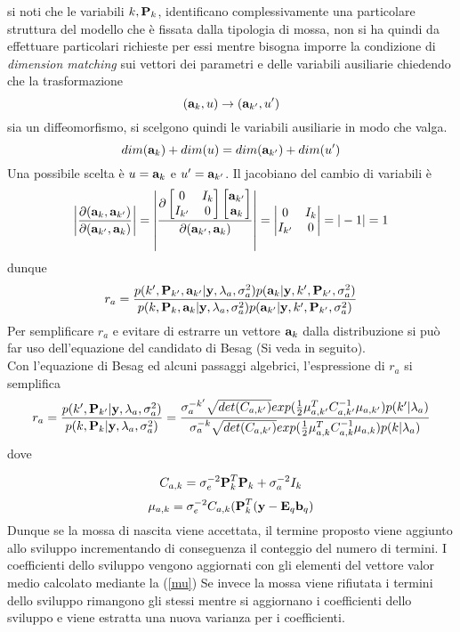 si noti che le variabili $k,\textbf{P}_k$, identificano complessivamente una particolare struttura
del modello che è fissata dalla tipologia di mossa, non si ha quindi da effettuare particolari richieste per essi mentre bisogna imporre la condizione di \textit{ dimension matching}
sui vettori dei parametri e delle variabili ausiliarie chiedendo che la trasformazione\\
\begin{equation}
(\textbf{a}_k,u)\rightarrow(\textbf{a}_{k'},u')
\end{equation}
sia un diffeomorfismo, si scelgono quindi le variabili ausiliarie in modo che valga.
\begin{equation}
dim(\textbf{a}_k)+dim(u)=dim(\textbf{a}_{k'})+dim(u')
\end{equation}
Una possibile scelta è $u = \textbf{a}_k$ e $u' =\textbf{a}_{k'}$. Il jacobiano del cambio di variabili è
\begin{equation}
\left\vert\frac{\partial(\textbf{a}_k,\textbf{a}_{k'})}{\partial(\textbf{a}_{k'},\textbf{a}_k)}\right\vert=
\left\vert\frac{\partial\begin{bmatrix}
0 & I_k \\ 
I_{k'} & 0
\end{bmatrix}
 \begin{bmatrix}
\textbf{a}_{k'} \\ 
\textbf{a}_k
\end{bmatrix} }{\partial(\textbf{a}_{k'},\textbf{a}_k)}\right\vert
=\begin{vmatrix}
0 & I_k \\ 
I_{k'} & 0
\end{vmatrix}=|-1|=1
\end{equation}
dunque
\begin{equation}
r_a=\frac{p(k',\textbf{P}_{k'},\textbf{a}_{k'} |\textbf{y},\lambda_a,\sigma_a^2)p(\textbf{a}_k|\textbf{y},k',\textbf{P}_{k'},\sigma_a^2)}{p(k,\textbf{P}_k,\textbf{a}_k |\textbf{y},\lambda_a,\sigma_a^2)p(\textbf{a}_{k'}|\textbf{y},k',\textbf{P}_{k'},\sigma_a^2)}
\end{equation}
Per semplificare $r_a$ e evitare di estrarre un vettore $\textbf{a}_k$ dalla distribuzione si può far
uso dell’equazione del candidato di Besag (Si veda in seguito).\\
Con l’equazione di Besag ed alcuni passaggi algebrici, l’espressione di $r_a$ si semplifica
\begin{equation}
r_a=\frac{p(k',\textbf{P}_{k'}|\textbf{y},\lambda_a,\sigma_a^2)}{p(k,\textbf{P}_k|\textbf{y},\lambda_a,\sigma_a^2)}=\frac{\sigma_a^{-k'}\sqrt{det(C_{a,k'})}
exp(\frac{1}{2}\mu_{a,k'}^TC_{a,k'}^{-1}\mu_{a,k'})p(k'|\lambda_a)}{\sigma_a^{-k}\sqrt{det(C_{a,k'})}
exp(\frac{1}{2}\mu_{a,k}^TC_{a,k}^{-1}\mu_{a,k})p(k|\lambda_a)} \label{ra}
\end{equation}
dove

\begin{equation}
C_{a,k}=\sigma_e^{-2}\textbf{P}_k^T\textbf{P}_k+\sigma_a^{-2}I_k
\end{equation}
\begin{equation}
\mu_{a,k}=\sigma_e^{-2}C_{a,k}(\textbf{P}_k^T(\textbf{y}-\textbf{E}_q\textbf{b}_q) \label{mu}
\end{equation}
Dunque se la mossa di nascita viene accettata, il termine proposto viene aggiunto
allo sviluppo incrementando di conseguenza il conteggio del numero di termini. I
coefficienti dello sviluppo vengono aggiornati con gli elementi del vettore valor medio
calcolato mediante la (\ref{mu})
Se invece la mossa viene rifiutata i termini dello sviluppo rimangono gli stessi mentre
si aggiornano i coefficienti dello sviluppo e viene estratta una nuova varianza per i
coefficienti.
